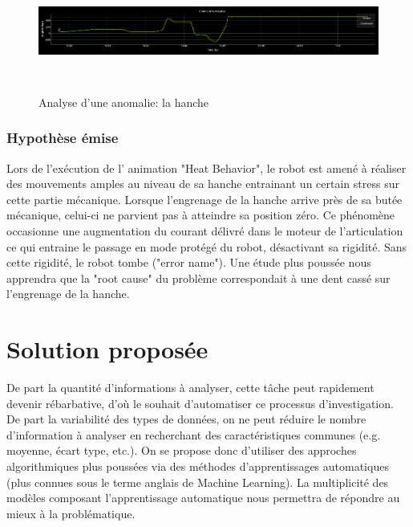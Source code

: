 \begin{figure}[h]
	\centering\includegraphics[height=4cm]{images/analyse_3.png}
	\caption{Analyse d'une anomalie: la hanche}
	\label{fig:analyse d'une anomalie: hipitch}
\end{figure}

\subsubsection{Hypothèse émise}
 Lors de l'exécution de l' animation "Heat Behavior", le robot est amené à réaliser des mouvements amples au niveau de sa hanche entrainant un certain stress sur cette partie mécanique. Lorsque l'engrenage de la hanche arrive près de sa butée mécanique, celui-ci ne parvient pas à atteindre sa position zéro.  Ce phénomène occasionne une augmentation du courant délivré dans le moteur de l'articulation ce qui entraine le passage en mode protégé du robot, désactivant sa rigidité.  Sans cette rigidité, le robot tombe ("error name"). Une étude plus poussée nous apprendra que la "root cause" du problème correspondait à une dent cassé sur l'engrenage de la hanche. 


\section{Solution proposée}
De part la quantité d'informations à analyser, cette tâche peut rapidement devenir rébarbative, d'où le souhait d'automatiser ce processus d'investigation. De part la variabilité des types de données, on ne peut réduire le nombre d'information à analyser en recherchant des caractéristiques communes (e.g. moyenne, écart type, etc.). On se propose donc d'utiliser des approches algorithmiques plus poussées via des méthodes d'apprentissages automatiques (plus connues sous le terme anglais de Machine Learning). La multiplicité des modèles composant l'apprentissage automatique nous permettra de répondre au mieux à la problématique.
